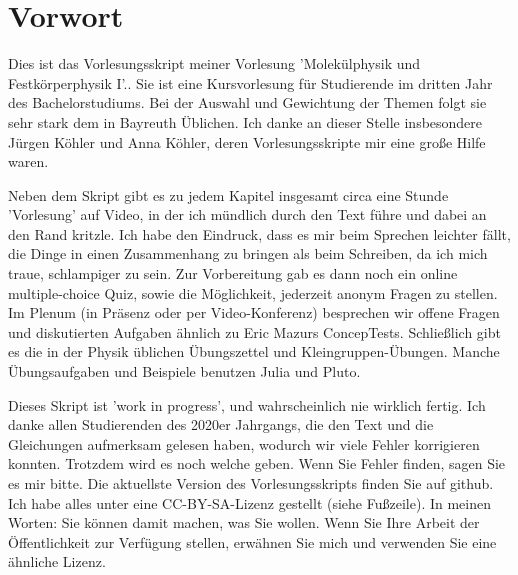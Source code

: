 \renewcommand{\lastmod}{\ \ }
\renewcommand{\chapterauthors}{\ \ }

\chapter*{Vorwort}

Dies ist das Vorlesungsskript meiner Vorlesung 'Molekülphysik und Festkörperphysik I'.. Sie ist eine Kursvorlesung für  Studierende im dritten Jahr des Bachelorstudiums. Bei der Auswahl und Gewichtung der Themen folgt sie sehr stark dem in Bayreuth Üblichen. Ich danke an dieser Stelle insbesondere Jürgen Köhler und Anna Köhler, deren Vorlesungsskripte mir eine große Hilfe waren.

Neben dem Skript gibt es zu jedem Kapitel  insgesamt circa eine Stunde 'Vorlesung' auf Video, in der ich mündlich durch den Text führe und dabei an den Rand kritzle.
Ich habe den Eindruck, dass es mir beim Sprechen leichter fällt, die Dinge in einen Zusammenhang zu bringen als beim Schreiben, da ich mich traue, schlampiger zu sein. Zur Vorbereitung gab es dann noch ein online multiple-choice Quiz, sowie die Möglichkeit, jederzeit anonym Fragen zu stellen.  Im Plenum (in Präsenz oder per Video-Konferenz) besprechen wir offene Fragen und diskutierten Aufgaben ähnlich zu Eric Mazurs 
ConcepTests.  Schließlich gibt es die in der Physik üblichen Übungszettel und Kleingruppen-Übungen. Manche Übungsaufgaben und Beispiele benutzen Julia  und Pluto. 



Dieses Skript ist 'work in progress', und wahrscheinlich nie wirklich fertig.  Ich danke allen Studierenden des 2020er Jahrgangs, die den Text und die Gleichungen aufmerksam gelesen haben, wodurch wir viele Fehler korrigieren konnten. Trotzdem wird es noch welche geben. Wenn Sie Fehler finden, sagen Sie es mir bitte. 
Die aktuellste Version des Vorlesungsskripts finden Sie auf github.  Ich habe alles unter eine CC-BY-SA-Lizenz gestellt (siehe Fußzeile). In meinen Worten: Sie können damit machen, was Sie wollen. Wenn Sie Ihre Arbeit der Öffentlichkeit zur Verfügung stellen, erwähnen Sie mich und verwenden Sie eine ähnliche Lizenz. 


